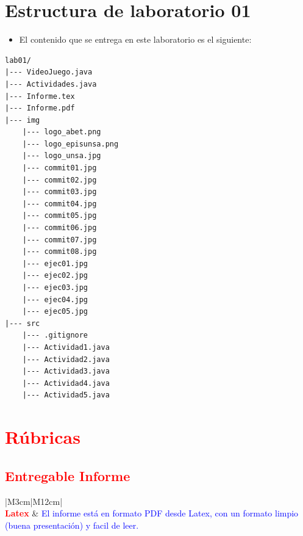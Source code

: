 \documentclass{article}
\begin{document}
\section{Estructura de laboratorio 01}
\begin{itemize}
	\item El contenido que se entrega en este laboratorio es el siguiente:
\end{itemize}

\begin{lstlisting}[style=ascii-tree]
lab01/
|--- VideoJuego.java
|--- Actividades.java
|--- Informe.tex
|--- Informe.pdf
|--- img
	|--- logo_abet.png
	|--- logo_episunsa.png
	|--- logo_unsa.jpg
	|--- commit01.jpg
	|--- commit02.jpg
	|--- commit03.jpg
	|--- commit04.jpg
	|--- commit05.jpg
	|--- commit06.jpg
	|--- commit07.jpg
	|--- commit08.jpg
	|--- ejec01.jpg
	|--- ejec02.jpg
	|--- ejec03.jpg
	|--- ejec04.jpg
	|--- ejec05.jpg
|--- src  
	|--- .gitignore
	|--- Actividad1.java
	|--- Actividad2.java
	|--- Actividad3.java
	|--- Actividad4.java
	|--- Actividad5.java
\end{lstlisting}
\pagebreak

\section{\textcolor{red}{Rúbricas}}

\subsection{\textcolor{red}{Entregable Informe}}
\begin{table}[H]
	\caption{Tipo de Informe}
	\setlength{\tabcolsep}{0.5em} %
	{\renewcommand{\arraystretch}{1.5}%
		\begin{tabular}{|M{3cm}|M{12cm}|}
			\hline
			                                                                                                      \\
			\hline
			\textbf{\textcolor{red}{Latex}} & \textcolor{blue}{El informe está en formato PDF desde Latex,  con un formato limpio (buena presentación) y facil de leer.} \\
			\hline
		\end{tabular}
	}
\end{table}
\end{document}
